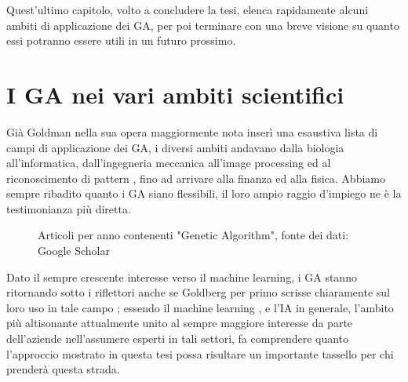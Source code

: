 
Quest'ultimo capitolo, volto a concludere la tesi, elenca rapidamente alcuni ambiti di applicazione dei GA, per poi terminare con una breve visione su quanto essi potranno essere utili in un futuro prossimo.
\section{I GA nei vari ambiti scientifici}
Gi\`a Goldman nella sua opera maggiormente nota \cite{goldberg1} inser\`i una esaustiva lista di campi di applicazione dei GA, i diversi ambiti andavano dalla biologia all'informatica, dall'ingegneria meccanica \cite{end1} all'image processing\cite{end2} ed al riconoscimento di pattern \cite{end3}, fino ad arrivare alla finanza\cite{end6} ed alla fisica. Abbiamo sempre ribadito quanto i GA siano flessibili, il loro ampio raggio d'impiego ne \`e la testimonianza pi\`u diretta.
\begin{figure}[H]%
    \centering
    \caption{Articoli per anno contenenti "Genetic Algorithm", fonte dei dati: Google Scholar}
    \label{fig:articles}%
\end{figure}
Dato il sempre crescente interesse verso il machine learning, i GA stanno ritornando sotto i riflettori anche se Goldberg per primo scrisse chiaramente sul loro uso in tale campo \cite{goldberg1} \cite{end7}; essendo il machine learning \cite{end4} \cite{end5}, e l'IA in generale, l'ambito pi\`u altisonante attualmente unito al sempre maggiore interesse da parte dell'aziende nell'assumere esperti in tali settori, fa comprendere quanto l'approccio mostrato in questa tesi possa risultare un importante tassello per chi prender\`a questa strada.
